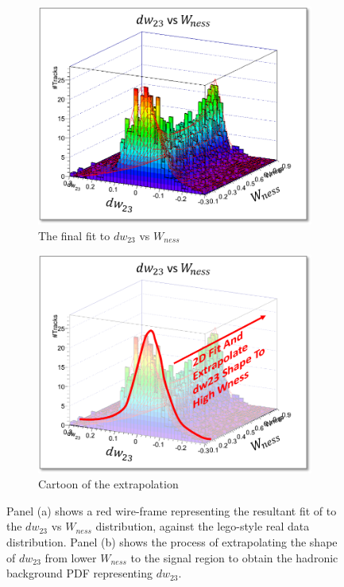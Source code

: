 \begin{figure}[ht]
  \centering
	\begin{subfigure}[t]{0.5\textwidth}
		\centering
    \includegraphics[width=0.95\linewidth]{./figures/dw23_vs_eta_3D.png}
    \caption{The final fit to $dw_{23}$ vs $W_{ness}$}
		\label{fig:3Ddw23_wness}
	\end{subfigure}%
  \begin{subfigure}[t]{0.5\textwidth}
		\centering
		\includegraphics[width=0.95\linewidth]{./figures/dw23_vs_eta_3D_overlay.png}
    \caption{Cartoon of the extrapolation}
		\label{fig:3Ddw23_wness_overlay}
	\end{subfigure}
  \caption{ 
    Panel (a) shows a red wire-frame representing the resultant fit of to the
    $dw_{23}$ vs $W_{ness}$ distribution, against the lego-style real data
    distribution. Panel (b) shows the process of extrapolating the shape of
    $dw_{23}$ from lower $W_{ness}$ to the signal region to obtain the hadronic
    background PDF representing $dw_{23}$.
  }
  \label{fig:dw23_fits}
\end{figure}

